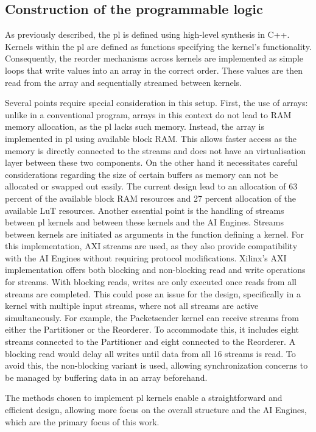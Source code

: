 \subsection{Construction of the programmable logic}
As previously described, the \ac{pl} is defined using high-level synthesis \cite{coussy_introduction_2009} in C++. Kernels within the \ac{pl} are defined as functions specifying the kernel’s functionality. Consequently, the reorder mechanisms across kernels are implemented as simple loops that write values into an array in the correct order. These values are then read from the array and sequentially streamed between kernels.\par
Several points require special consideration in this setup. First, the use of arrays: unlike in a conventional program, arrays in this context do not lead to RAM memory allocation, as the \ac{pl} lacks such memory. Instead, the array is implemented in \ac{pl} using available block RAM. This allows faster access as the memory is directly connected to the streams and does not have an virtualisation layer between these two components. On the other hand it necessitates careful considerations regarding the size of certain buffers as memory can not be allocated or swapped out easily. The current design lead to an allocation of 63 percent of the available block RAM resources and 27 percent allocation of the available LuT resources.  Another essential point is the handling of streams between \ac{pl} kernels and between these kernels and the AI Engines. Streams between kernels are initiated as arguments in the function defining a kernel. For this implementation, AXI streams are used, as they also provide compatibility with the AI Engines without requiring protocol modifications. Xilinx's AXI implementation offers both blocking and non-blocking read and write operations for streams. With blocking reads, writes are only executed once reads from all streams are completed. This could pose an issue for the design, specifically in a kernel with multiple input streams, where not all streams are active simultaneously. For example, the Packetsender kernel can receive streams from either the Partitioner or the Reorderer. To accommodate this, it includes eight streams connected to the Partitioner and eight connected to the Reorderer. A blocking read would delay all writes until data from all 16 streams is read. To avoid this, the non-blocking variant is used, allowing synchronization concerns to be managed by buffering data in an array beforehand.\par
The methods chosen to implement \ac{pl} kernels enable a straightforward and efficient design, allowing more focus on the overall structure and the AI Engines, which are the primary focus of this work.\par

